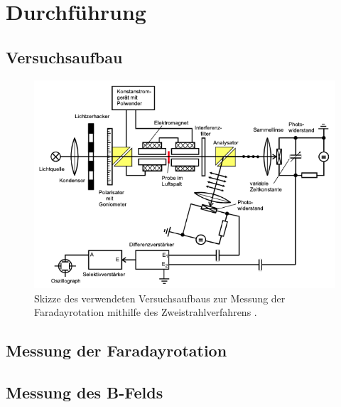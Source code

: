 \section{Durchführung}
\label{sec:Durchführung}

\subsection{Versuchsaufbau}
\label{subsec:Versuchsaufbau}

\begin{figure}
    \centering
    \includegraphics[width=\textwidth]{content/pics/Aufbau.png}
    \caption{Skizze des verwendeten Versuchsaufbaus zur Messung der Faradayrotation mithilfe des Zweistrahlverfahrens \cite{V46}.}
    \label{fig:Aufbau}
\end{figure}

\subsection{Messung der Faradayrotation}
\label{subsec:Messung der Faradayrotation}

\subsection{Messung des \textbf{B}-Felds}
\label{subsec:Messung des B-Felds}